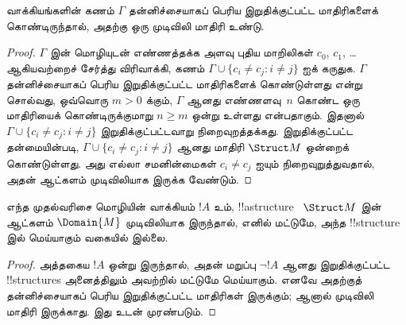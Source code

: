 \documentclass[../../../include/open-logic-section]{subfiles}
\begin{document}


\begin{thm}
 வாக்கியங்களின் கணம் $\Gamma$ தன்னிச்சையாகப் பெரிய
இறுதிக்குட்பட்ட மாதிரிகளைக் கொண்டிருந்தால், அதற்கு ஒரு முடிவிலி மாதிரி
உண்டு.
\end{thm}

\begin{proof}
$\Gamma$ இன் மொழியுடன் எண்ணத்தக்க அளவு புதிய மாறிலிகள்
$c_0$, $c_1$, \dots ஆகியவற்றைச் சேர்த்து விரிவாக்கி, கணம்
$\Gamma \cup \{c_i \neq c_j :
i \neq j\}$ ஐக் கருதுக. $\Gamma$ தன்னிச்சையாகப் பெரிய
இறுதிக்குட்பட்ட மாதிரிகளைக் கொண்டுள்ளது என்று சொல்வது, ஒவ்வொரு
$m >0$ க்கும், $\Gamma$ ஆனது எண்ணளவு~$n$ கொண்ட ஒரு மாதிரியைக்
கொண்டிருக்குமாறு $n\ge m$ ஒன்று உள்ளது என்பதாகும். இதனால்
$\Gamma \cup \{c_i \neq
c_j : i \neq j\}$ இறுதிக்குட்பட்டவாறு நிறைவுறத்தக்கது.
இறுதிக்குட்பட்ட தன்மையின்படி, $\Gamma
\cup \{c_i \neq c_j : i \neq j\}$ ஆனது மாதிரி $\Struct M$ ஒன்றைக்
கொண்டுள்ளது. அது எல்லா சமனின்மைகள் $c_i \neq c_j$ ஐயும்
நிறைவுறுத்துவதால், அதன் ஆட்களம் முடிவிலியாக இருக்க வேண்டும்.
\end{proof}

\begin{prop}
எந்த முதல்வரிசை மொழியின் வாக்கியம் $!A$ உம், !!a{structure}
~$\Struct M$ இன் ஆட்களம் $\Domain{M}$ முடிவிலியாக இருந்தால், எனில்
மட்டுமே, அந்த !!{structure} இல் மெய்யாகும் வகையில் இல்லை.
\end{prop}

\begin{proof}
அத்தகைய $!A$ ஒன்று இருந்தால், அதன் மறுப்பு $\lnot !A$ ஆனது
இறுதிக்குட்பட்ட !!{structure}s அனைத்திலும் அவற்றில் மட்டுமே மெய்யாகும்.
எனவே அதற்குத் தன்னிச்சையாகப் பெரிய இறுதிக்குட்பட்ட மாதிரிகள் இருக்கும்;
ஆனால் முடிவிலி மாதிரி இருக்காது. இது  உடன் முரண்படும்.
\end{proof}
\end{document}
